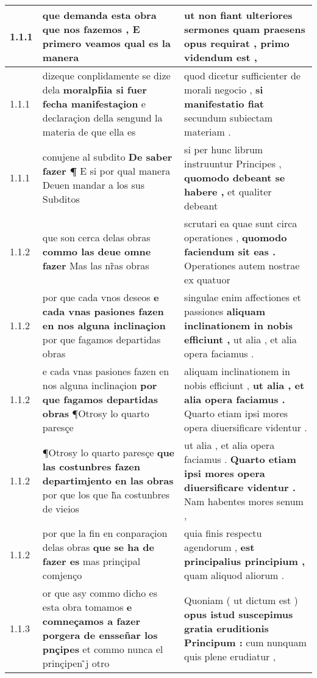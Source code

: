 \begin{tabular}{|p{1cm}|p{6.5cm}|p{6.5cm}|}

\hline
1.1.1 & que demanda esta obra \textbf{ que nos fazemos , } E primero veamos qual es la manera & ut non fiant ulteriores sermones \textbf{ quam praesens opus requirat , } primo videndum est , \\\hline
1.1.1 & dizeque conplidamente se dize dela \textbf{ moralph̃ia si fuer fecha manifestaçion } e declaraçion della sengund la materia de que ella es & quod dicetur sufficienter de morali negocio , \textbf{ si manifestatio fiat } secundum subiectam materiam . \\\hline
1.1.1 & conujene al subdito \textbf{ De saber fazer ¶ } E si por qual manera Deuen mandar a los sus Subditos & si per hunc librum instruuntur Principes , \textbf{ quomodo debeant se habere , } et qualiter debeant \\\hline
1.1.2 & que son cerca delas obras \textbf{ commo las deue omne fazer } Mas las nr̃as obras & scrutari ea quae sunt circa operationes , \textbf{ quomodo faciendum sit eas . } Operationes autem nostrae ex quatuor \\\hline
1.1.2 & por que cada vnos deseos \textbf{ e cada vnas pasiones fazen en nos alguna inclinaçion } por que fagamos departidas obras & singulae enim affectiones et passiones \textbf{ aliquam inclinationem in nobis efficiunt , } ut alia , et alia opera faciamus . \\\hline
1.1.2 & e cada vnas pasiones fazen en nos alguna inclinaçion \textbf{ por que fagamos departidas obras } ¶Otrosy lo quarto paresçe & aliquam inclinationem in nobis efficiunt , \textbf{ ut alia , et alia opera faciamus . } Quarto etiam ipsi mores opera diuersificare videntur . \\\hline
1.1.2 & ¶Otrosy lo quarto paresçe \textbf{ que las costunbres fazen departimjento en las obras } por que los que h̃a costunbres de vieios & ut alia , et alia opera faciamus . \textbf{ Quarto etiam ipsi mores opera diuersificare videntur . } Nam habentes mores senum , \\\hline
1.1.2 & por que la fin en conparaçion delas obras \textbf{ que se ha de fazer es } mas prinçipal comjenço & quia finis respectu agendorum , \textbf{ est principalius principium , } quam aliquod aliorum . \\\hline
1.1.3 & or que asy commo dicho es esta obra tomamos \textbf{ e comneçamos a fazer porgera de ensseñar los pnçipes } et commo nunca el prinçipen ̃j otro & Quoniam ( ut dictum est ) \textbf{ opus istud suscepimus gratia eruditionis Principum : } cum nunquam quis plene erudiatur , \\\hline

\end{tabular}

